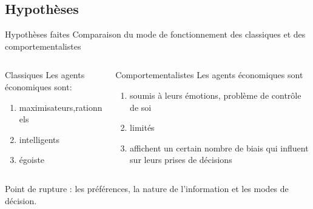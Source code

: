 \documentclass[serif]{beamer}
\begin{document}
\subsection{Hypothèses}
\begin{frame}{Hypothèses faites}
\transwipe[duration=0.3]
Comparaison du mode de fonctionnement des classiques et des comportementalistes
\begin{columns}
\begin{column}{0.5\textwidth}
	 \begin{block}{Classiques}
	 Les agents économiques sont:
	   \begin{enumerate}
	   	\item maximisateurs,rationnels
	   	\item intelligents 
	   	\item égoiste 
	   \end{enumerate}
	 \end{block}
\end{column}
\begin{column}{0.5\textwidth}
		\begin{exampleblock}{Comportementalistes}
		 Les agents économiques sont
			\begin{enumerate}
			 \item soumis à leurs émotions, problème de contrôle de soi
			 \item limités 
			 \item affichent un certain nombre de biais qui influent sur leurs prises de décisions
			\end{enumerate}
		\end{exampleblock}
\end{column}
\end{columns}
\vspace*{0.5cm}
Point de rupture : les préférences, la nature de l’information et les modes de décision.
\end{frame}
\end{document}
